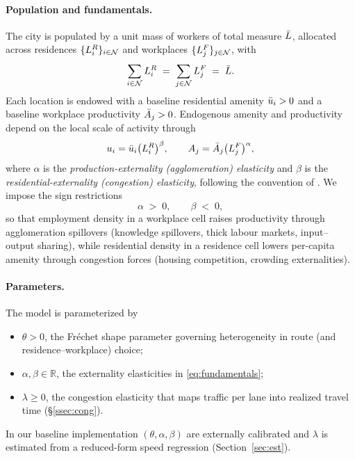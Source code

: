 \paragraph{Population and fundamentals.}
The city is populated by a unit mass of workers of total measure
$\bar L$, allocated across residences $\{L_i^R\}_{i\in\mathcal N}$ and
workplaces $\{L_j^F\}_{j\in\mathcal N}$, with
\begin{equation}
  \sum_{i\in\mathcal N} L_i^R
  \;=\;
  \sum_{j\in\mathcal N} L_j^F
  \;=\;
  \bar L.
  \label{eq:pop}
\end{equation}
Each location is endowed with a baseline residential amenity
$\bar u_i>0$ and a baseline workplace productivity $\bar A_j>0$.
Endogenous amenity and productivity depend on the local scale of
activity through
\begin{equation}
  u_i=\bar u_i\bigl(L_i^R\bigr)^{\beta},
  \qquad
  A_j=\bar A_j\bigl(L_j^F\bigr)^{\alpha},
  \label{eq:fundamentals}
\end{equation}
where $\alpha$ is the \emph{production-externality (agglomeration)
elasticity} and $\beta$ is the \emph{residential-externality
(congestion) elasticity}, following the convention of
\cite{AllenArkolakis2014,AllenArkolakis2022}.  We impose the sign
restrictions
\begin{equation}
  \alpha\;>\;0,
  \qquad
  \beta\;<\;0,
  \label{eq:sign}
\end{equation}
so that employment density in a workplace cell raises productivity
through agglomeration spillovers (knowledge spillovers, thick labour
markets, input--output sharing), while residential density in a
residence cell lowers per-capita amenity through congestion forces
(housing competition, crowding externalities).  

\paragraph{Parameters.}
The model is parameterized by
\begin{itemize}[leftmargin=2em,itemsep=0.2em]
  \item $\theta>0$, the Fr\'echet shape parameter governing
        heterogeneity in route (and residence--workplace) choice;
  \item $\alpha,\beta\in\mathbb R$, the externality elasticities in
        \eqref{eq:fundamentals};
  \item $\lambda\ge0$, the congestion elasticity that maps traffic per
        lane into realized travel time (\S\ref{ssec:cong}).
\end{itemize}
In our baseline implementation $(\theta,\alpha,\beta)$ are externally
calibrated and $\lambda$ is estimated from a reduced-form speed
regression (Section~\ref{sec:est}).

